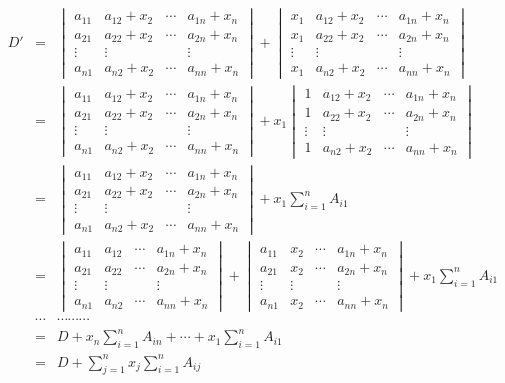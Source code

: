 \documentclass[a4paper]{book}
\begin{document}
\begin{eqnarray*}
D' & = & \begin{vmatrix} a_{11} & a_{12}+x_2 & \cdots & a_{1n}+x_n \\ a_{21} & a_{22}+x_2 & \cdots & a_{2n}+x_n \\ \vdots & \vdots & & \vdots \\ a_{n1} & a_{n2}+x_2 & \cdots & a_{nn}+x_n \end{vmatrix} + \begin{vmatrix} x_1 & a_{12}+x_2 & \cdots & a_{1n}+x_n \\ x_1 & a_{22}+x_2 & \cdots & a_{2n}+x_n \\ \vdots & \vdots & & \vdots \\ x_1 & a_{n2}+x_2 & \cdots & a_{nn}+x_n \end{vmatrix} \\
& = & \begin{vmatrix} a_{11} & a_{12}+x_2 & \cdots & a_{1n}+x_n \\ a_{21} & a_{22}+x_2 & \cdots & a_{2n}+x_n \\ \vdots & \vdots & & \vdots \\ a_{n1} & a_{n2}+x_2 & \cdots & a_{nn}+x_n \end{vmatrix} + x_1 \begin{vmatrix} 1 & a_{12}+x_2 & \cdots & a_{1n}+x_n \\ 1 & a_{22}+x_2 & \cdots & a_{2n}+x_n \\ \vdots & \vdots & & \vdots \\ 1 & a_{n2}+x_2 & \cdots & a_{nn}+x_n \end{vmatrix} \\
& = & \begin{vmatrix} a_{11} & a_{12}+x_2 & \cdots & a_{1n}+x_n \\ a_{21} & a_{22}+x_2 & \cdots & a_{2n}+x_n \\ \vdots & \vdots & & \vdots \\ a_{n1} & a_{n2}+x_2 & \cdots & a_{nn}+x_n \end{vmatrix} + x_1 \sum\limits_{i=1}^n A_{i1} \\
& = & \begin{vmatrix} a_{11} & a_{12} & \cdots & a_{1n}+x_n \\ a_{21} & a_{22} & \cdots & a_{2n}+x_n \\ \vdots & \vdots & & \vdots \\ a_{n1} & a_{n2} & \cdots & a_{nn}+x_n \end{vmatrix} + \begin{vmatrix} a_{11} & x_2 & \cdots & a_{1n}+x_n \\ a_{21} & x_2 & \cdots & a_{2n}+x_n \\ \vdots & \vdots & & \vdots \\ a_{n1} & x_2 & \cdots & a_{nn}+x_n \end{vmatrix} + x_1 \sum\limits_{i=1}^n A_{i1} \\
& \cdots & \cdots\cdots\cdots \\
& = & D + x_n \sum\limits_{i=1}^n A_{in} + \cdots + x_1 \sum\limits_{i=1}^n A_{i1} \\
& = & D + \sum\limits_{j=1}^n x_j \sum\limits_{i=1}^n A_{ij}
\end{eqnarray*}
\end{document}

